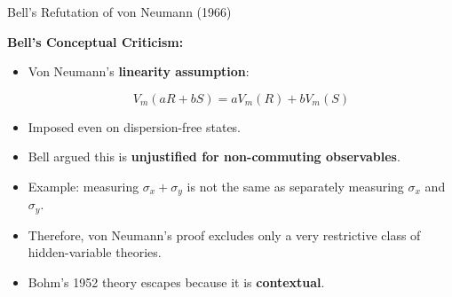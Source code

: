 \begin{frame}{Bell’s Refutation of von Neumann (1966)}

\begin{minipage}{0.65\textwidth}
\textbf{Bell’s Conceptual Criticism:}
\begin{itemize}
  \item Von Neumann’s \textbf{linearity assumption}: 
   \vspace{-0.4cm}

  \[
    V_m(aR+bS) = aV_m(R) + bV_m(S)
  \]

  \vspace{-0.3cm}
  \pause
  \item Imposed even on dispersion-free states.  
  \pause
  \item Bell argued this is \textbf{unjustified for non-commuting observables}.  
  \pause
  \item Example: measuring $\sigma_x + \sigma_y$ is not the same as separately measuring $\sigma_x$ and $\sigma_y$.  
  \pause
  \item Therefore, von Neumann’s proof excludes only a very restrictive class of hidden-variable theories.  
  \pause
  \item Bohm’s 1952 theory escapes because it is \textbf{contextual}.  
\end{itemize}
\end{minipage}
\hfill
\begin{minipage}{0.33\textwidth}
  \centering


\end{minipage}
\end{frame}
